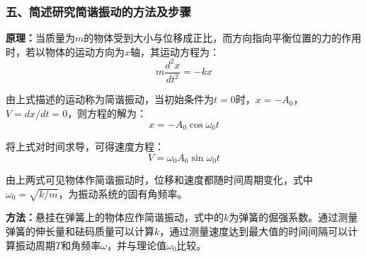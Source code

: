 \documentclass[dvipsnames, svgnames,a4paper,11pt]{article}
\begin{document}
\subsubsection{五、简述研究简谐振动的方法及步骤}

\textbf{原理：}当质量为$m$的物体受到大小与位移成正比，而方向指向平衡位置的力的作用时，若以物体的运动方向为$x$轴，其运动方程为：
\begin{equation}
	m\frac{d^2x}{dt^2} = -kx
\end{equation}

由上式描述的运动称为简谐振动，当初始条件为$t = 0$时，$x = -A_0$，$V = dx/dt = 0$，则方程的解为：
\begin{equation}
	x = -A_0\cos\omega_0 t
\end{equation}

将上式对时间求导，可得速度方程：
\begin{equation}
	V = \omega_0 A_0\sin\omega_0 t
\end{equation}

由上两式可见物体作简谐振动时，位移和速度都随时间周期变化，式中$\omega_0 = \sqrt{k/m}$，为振动系统的固有角频率。

\textbf{方法：}悬挂在弹簧上的物体应作简谐振动，式中的$k$为弹簧的倔强系数。通过测量弹簧的伸长量和砝码质量可以计算$k$，通过测量速度达到最大值的时间间隔可以计算振动周期$T$和角频率$\omega$，并与理论值$\omega_0$比较。
\end{document}

